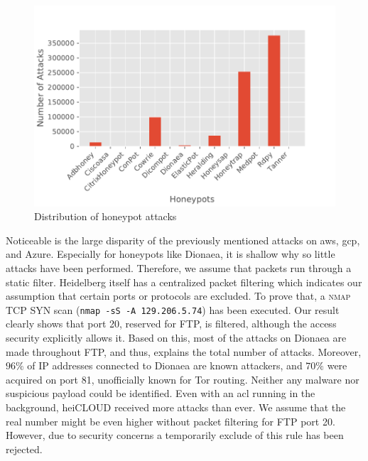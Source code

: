 \begin{figure}[ht]
    \centering
    \includegraphics[width=\textwidth]{figures/tpot-overview-attacks.pdf}
    \caption[Distribution of honeypot attacks]{Distribution of honeypot attacks}
    \label{fig:overview-attacks}
\end{figure}

Noticeable is the large disparity of the previously mentioned attacks on \ac{aws}, \ac{gcp}, and Azure.
Especially for honeypots like Dionaea, it is shallow why so little attacks have been performed.
Therefore, we assume that packets run through a static filter.
Heidelberg itself has a centralized packet filtering which indicates our assumption that certain ports or protocols are excluded.
To prove that, a \textsc{nmap} TCP SYN scan (\verb|nmap -sS -A 129.206.5.74|) has been executed. %
Our result clearly shows that port 20, reserved for FTP, is filtered, although the access security explicitly allows it.
Based on this, most of the attacks on Dionaea are made throughout FTP, and thus, explains the total number of attacks.
Moreover, $96\%$ of IP addresses connected to Dionaea are known attackers, and $70\%$ were acquired on port 81, unofficially known for Tor routing.
Neither any malware nor suspicious payload could be identified.
Even with an \ac{acl} running in the background, heiCLOUD received more attacks than ever.
We assume that the real number might be even higher without packet filtering for FTP port 20.
However, due to security concerns a temporarily exclude of this rule has been rejected.

